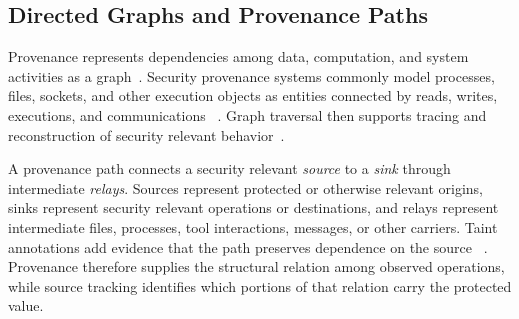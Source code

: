 \subsection{Directed Graphs and Provenance Paths}

Provenance represents dependencies among data, computation, and system
activities as a graph~\cite{moreau2013provdm}. Security provenance systems
commonly model processes, files, sockets, and other execution objects as
entities connected by reads, writes, executions, and communications
~\cite{bates2015trustworthy,hossain2017sleuth,pasquier2018camquery}.
Graph traversal then supports tracing and reconstruction of security relevant
behavior~\cite{han2020unicorn,cheng2024kairos}.

A provenance path connects a security relevant \emph{source} to a
\emph{sink} through intermediate \emph{relays}. Sources represent protected or
otherwise relevant origins, sinks represent security relevant operations or
destinations, and relays represent intermediate files, processes, tool
interactions, messages, or other carriers. Taint annotations add evidence that
the path preserves dependence on the source
~\cite{hossain2017sleuth,schwartz2010all}. Provenance therefore supplies the
structural relation among observed operations, while source tracking identifies
which portions of that relation carry the protected value.